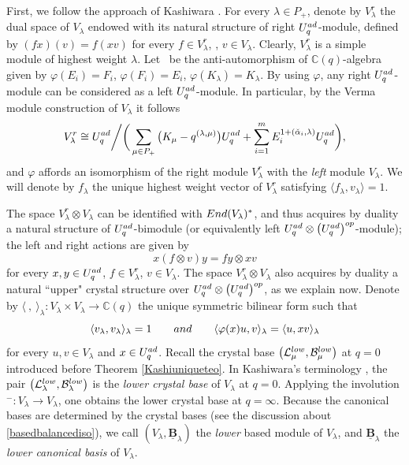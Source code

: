 \documentclass[11pt]{article}
\numberwithin{equation}{section}
\numberwithin{equation}{section}
\theoremstyle{definition}
\newcommand{\mc}{\mathbb{C}}
\newcommand{\Ll}{{\mathcal L}}
\newcommand{\ra}{\rightarrow}
\begin{document}
First, we follow the approach of Kashiwara \cite{Kashiwara2,Kashiwara3}. For every $\lambda\in P_+$, denote by $V_\lambda^r$ the dual space of $V_\lambda$ endowed with its natural structure of right $U_q^{\rm ad}$-module, defined by ${(f x)(v) = f(xv)}$
for every $f\in V_\lambda^r$, , $v\in V_\lambda$.
Clearly, $V_\lambda^r$ is a simple module of highest weight $\lambda$.
 Let~\smash{$\varphi\colon U_q^{\rm ad} \ra U_q^{\rm ad}$} be the anti-automorphism of $\mc(q)$-algebra given by $\varphi(E_i) = F_i$, $\varphi(F_i) = E_i$, $\varphi(K_\lambda) = K_{\lambda}$. By using $\varphi$, any right $U_q^{\rm ad}$-module can be considered as a left $U_q^{\rm ad}$-module. In particular, by the Verma module construction of $V_\lambda$ it follows
\[V_\lambda^r \cong U_q^{\rm ad}\bigg/\bigg(\sum_{\mu\in P_+} \big(K_\mu -q^{(\lambda,\mu)}\big)U_q^{\rm ad}+ \sum_{i=1}^m E_i^{1+(\check{\alpha}_i,\lambda)}U_q^{\rm ad}\bigg),\]
and $\varphi$ affords an isomorphism of the right module $V_\lambda^r$ with the {\it left} module $V_\lambda$. We will denote by $f_\lambda$ the unique highest weight vector of $V_\lambda^r$ satisfying $\langle f_\lambda,v_\lambda\rangle = 1$.

The space $V_\lambda^r \otimes V_\lambda$ can be identified with ${\rm End}(V_\lambda)^*$, and thus acquires by duality a natural structure of $U_q^{\rm ad}$-bimodule \big(or equivalently left $U_q^{\rm ad} \otimes \big(U_q^{\rm ad}\big)^{\rm op}$-module\big); the left and right actions are given by
\begin{equation}\label{bimodaction}x(f \otimes v)y = fy \otimes xv
\end{equation}
for every $x,y\in U_q^{\rm ad}$, $f\in V_\lambda^r$, $v\in V_\lambda$. The space $V_\lambda^r \otimes V_\lambda$ also acquires by duality a natural ``upper" crystal structure over $U_q^{\rm ad} \otimes \big(U_q^{\rm ad}\big)^{\rm op}$, as we explain now. Denote by $\langle \ ,\ \rangle_\lambda \colon V_\lambda \times V_\lambda \ra \mc(q)$ the unique symmetric bilinear form such that
\begin{equation}\label{proppairinglambda}
\langle v_\lambda,v_\lambda\rangle_\lambda =1\qquad{\rm and}\qquad \langle \varphi(x)u,v\rangle_\lambda = \langle u, xv\rangle_\lambda
\end{equation}
for every $u,v\in V_\lambda$ and $x\in U_q^{\rm ad}$. Recall the crystal base $\big(\Ll_\mu^{\rm low},\mathcal{B}_\mu^{\rm low}\big)$ at $q=0$ introduced before Theorem \ref{Kashiuniqueteo}. In Kashiwara's terminology \cite{Kashiwara1, Kashiwara2}, the pair $\big(\Ll_{\lambda}^{\rm low},\mathcal{B}_\lambda^{\rm low}\big)$ is the {\it lower crystal base} of $V_\lambda$ at $q=0$. Applying the involution ${}^-\colon V_\lambda\ra V_\lambda$, one obtains the lower crystal base \smash{$\big(\overline{\Ll_{\lambda}^{\rm low}},\overline{\mathcal{B}_\lambda^{\rm low}}\big)$} at $q=\infty$. Because the canonical bases are determined by the crystal bases (see the discussion about \eqref{basedbalancediso}), we call $(V_\lambda,\underline{\mathbf{B}}_\lambda)$ the {\it lower} based module of $V_\lambda$, and $\underline{\mathbf{B}}_\lambda$ the {\it lower canonical basis} of $V_\lambda$.
\end{document}
